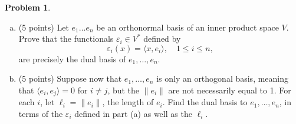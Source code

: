\documentclass[11pt,oneside]{amsart}
\theoremstyle{definition}
\newtheorem{problem}{Problem}
\newcommand{\eps}{\varepsilon}
\begin{document}
    
    \begin{problem}
        \leavevmode\begin{enumerate}[(a)]
            \item (5 points) Let $e_1\dots e_n$ be an orthonormal basis of an inner product space $V$. Prove that the functionals $\eps_i\in V^*$ defined by
            \[\eps_i(x)=\langle x, e_i\rangle, \quad 1\leq i\leq n,\]
            are precisely the dual basis of $e_1,\dots,e_n$.
            \vfill

            \item (5 points) Suppose now that $e_1,\dots,e_n$ is only an orthogonal basis, meaning that $\langle e_i,e_j\rangle=0$ for $i\neq j$, but the $\|e_i\|$ are not necessarily equal to 1. For each $i$, let $\ell_i=\|e_i\|$, the length of $e_i$. Find the dual basis to $e_1,\dots,e_n$, in terms of the $\eps_i$ defined in part (a) as well as the $\ell_i$.
            \vfill
        \end{enumerate}
    \end{problem}
\end{document}
